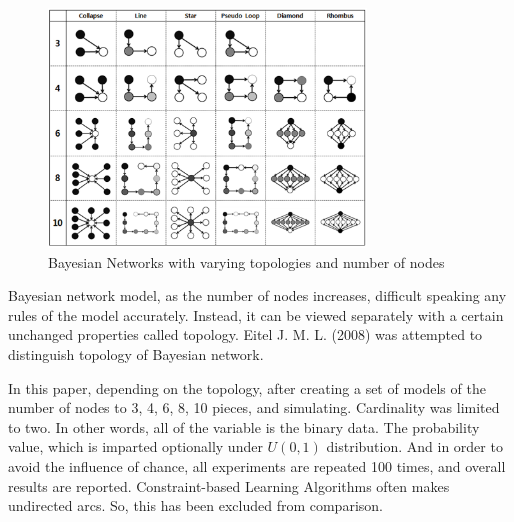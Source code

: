 	\begin{figure}[!h]
	\centering
		\includegraphics[height=180pt]{images/Topologies}
		\caption{Bayesian Networks with varying topologies and number of nodes}
	\end{figure}

Bayesian network model, as the number of nodes increases, difficult speaking any rules of the model accurately. Instead, it can be viewed separately with a certain unchanged properties called topology.
Eitel J. M. L. (2008) was attempted to distinguish topology of Bayesian network.

In this paper, depending on the topology, after creating a set of models of the number of nodes to 3, 4, 6, 8, 10 pieces, and simulating. Cardinality was limited to two. In other words, all of the variable is the binary data. The probability value, which is imparted optionally under $ U (0,1) $ distribution. And in order to avoid the influence of chance, all experiments are repeated 100 times, and overall results are reported. Constraint-based Learning Algorithms often makes undirected arcs. So, this has been excluded from comparison.